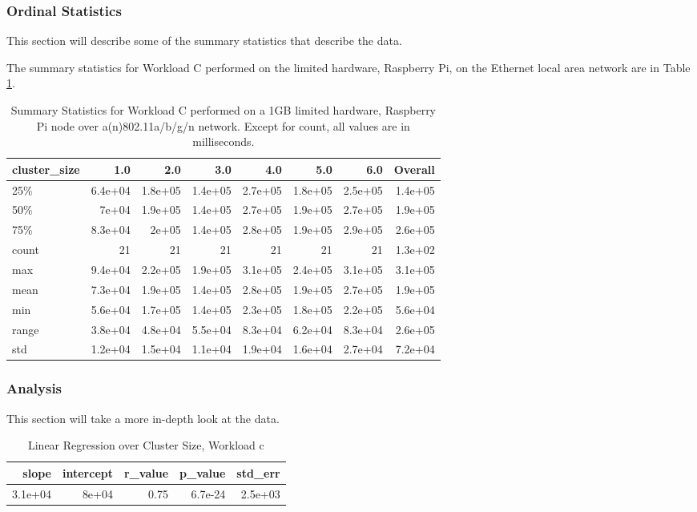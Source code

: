 \subsubsection{Ordinal Statistics}
This section will describe some of the summary statistics that describe the data.  

The summary statistics for Workload C performed on the limited hardware, Raspberry Pi, on the Ethernet local area network are in Table \ref{table:summary_table_c_1GB_rp_wlan}.
\begin{table}
\begin{tabular}{lrrrrrrr}
\toprule
cluster\_size &     1.0 &     2.0 &     3.0 &     4.0 &     5.0 &     6.0 &  Overall \\
\midrule
25\%   & 6.4e+04 & 1.8e+05 & 1.4e+05 & 2.7e+05 & 1.8e+05 & 2.5e+05 &  1.4e+05 \\
50\%   &   7e+04 & 1.9e+05 & 1.4e+05 & 2.7e+05 & 1.9e+05 & 2.7e+05 &  1.9e+05 \\
75\%   & 8.3e+04 &   2e+05 & 1.4e+05 & 2.8e+05 & 1.9e+05 & 2.9e+05 &  2.6e+05 \\
count &      21 &      21 &      21 &      21 &      21 &      21 &  1.3e+02 \\
max   & 9.4e+04 & 2.2e+05 & 1.9e+05 & 3.1e+05 & 2.4e+05 & 3.1e+05 &  3.1e+05 \\
mean  & 7.3e+04 & 1.9e+05 & 1.4e+05 & 2.8e+05 & 1.9e+05 & 2.7e+05 &  1.9e+05 \\
min   & 5.6e+04 & 1.7e+05 & 1.4e+05 & 2.3e+05 & 1.8e+05 & 2.2e+05 &  5.6e+04 \\
range & 3.8e+04 & 4.8e+04 & 5.5e+04 & 8.3e+04 & 6.2e+04 & 8.3e+04 &  2.6e+05 \\
std   & 1.2e+04 & 1.5e+04 & 1.1e+04 & 1.9e+04 & 1.6e+04 & 2.7e+04 &  7.2e+04 \\
\bottomrule
\end{tabular}
\caption{Summary Statistics for Workload C performed on a 1GB limited hardware, Raspberry Pi node over a(n)802.11a/b/g/n network.  Except for count, all values are in milliseconds.}
\label{table:summary_table_c_1GB_rp_wlan}
\end{table}



\subsubsection{Analysis}
This section will take a more in-depth look at the data.


\begin{table}[H]
\centering
\begin{tabular}{rrrrr}
\toprule
  slope &  intercept &  r\_value &  p\_value &  std\_err \\
\midrule
3.1e+04 &      8e+04 &     0.75 &  6.7e-24 &  2.5e+03 \\
\bottomrule
\end{tabular}
\caption{Linear Regression over Cluster Size, Workload c}
\label{table:wlan_only_c}
\end{table}



